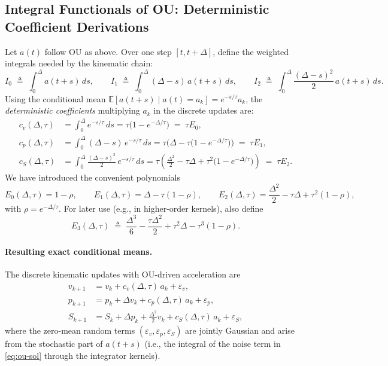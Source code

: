 \documentclass[11pt]{article}
\begin{document}
\subsection{Integral Functionals of OU: Deterministic Coefficient Derivations}
Let $a(t)$ follow OU as above. Over one step $[t,t+\Delta]$, define the weighted
integrals needed by the kinematic chain:
\begin{equation}
I_0 \;\triangleq\; \int_0^\Delta a(t+s)\,ds,\qquad
I_1 \;\triangleq\; \int_0^\Delta (\Delta-s)\,a(t+s)\,ds,\qquad
I_2 \;\triangleq\; \int_0^\Delta \frac{(\Delta-s)^2}{2}\,a(t+s)\,ds.
\label{eq:ou-I012}
\end{equation}
Using the conditional mean $\mathbb{E}[a(t+s)\mid a(t){=}a_k]=e^{-s/\tau} a_k$,
the \emph{deterministic coefficients} multiplying $a_k$ in the discrete updates are:
\begin{align}
c_v(\Delta,\tau)
&= \int_0^\Delta e^{-s/\tau}\,ds
= \tau\big(1-e^{-\Delta/\tau}\big)
\;=\; \tau E_0, 
\label{eq:cv-ou}
\\
c_p(\Delta,\tau)
&= \int_0^\Delta (\Delta-s)\,e^{-s/\tau}\,ds
= \tau\Big(\Delta - \tau\big(1-e^{-\Delta/\tau}\big)\Big)
\;=\; \tau E_1, 
\label{eq:cp-ou}
\\
c_S(\Delta,\tau)
&= \int_0^\Delta \frac{(\Delta-s)^2}{2}\,e^{-s/\tau}\,ds
= \tau\left(\frac{\Delta^2}{2} - \tau\Delta + \tau^2\big(1-e^{-\Delta/\tau}\big)\right)
\;=\; \tau E_2.
\label{eq:cS-ou}
\end{align}
We have introduced the convenient polynomials
\begin{equation}
E_0(\Delta,\tau)=1-\rho,\qquad
E_1(\Delta,\tau)=\Delta - \tau(1-\rho),\qquad
E_2(\Delta,\tau)=\frac{\Delta^2}{2} - \tau\Delta + \tau^2(1-\rho),
\label{eq:E012}
\end{equation}
with $\rho=e^{-\Delta/\tau}$. For later use (e.g., in higher-order kernels), also define
\begin{equation}
E_3(\Delta,\tau)
\;\triangleq\;
\frac{\Delta^3}{6} - \frac{\tau\Delta^2}{2} + \tau^2\Delta - \tau^3(1-\rho).
\label{eq:E3}
\end{equation}

\paragraph{Resulting exact conditional means.}
The discrete kinematic updates with OU-driven acceleration are
\begin{align}
v_{k+1} &= v_k + c_v(\Delta,\tau)\,a_k + \varepsilon_v, \label{eq:v-disc-mean}\\
p_{k+1} &= p_k + \Delta v_k + c_p(\Delta,\tau)\,a_k + \varepsilon_p, \label{eq:p-disc-mean}\\
S_{k+1} &= S_k + \Delta p_k + \frac{\Delta^2}{2} v_k + c_S(\Delta,\tau)\,a_k + \varepsilon_S, \label{eq:S-disc-mean}
\end{align}
where the zero-mean random terms $(\varepsilon_v,\varepsilon_p,\varepsilon_S)$ are jointly Gaussian and arise from the
stochastic part of $a(t+s)$ (i.e., the integral of the noise term in \eqref{eq:ou-sol} through the integrator kernels).
\end{document}
